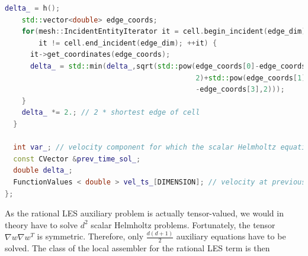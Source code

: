 \documentclass[a4paper, 11pt, twoside]{article}
\begin{document}
\begin{lstlisting}[language=C++, basicstyle={\footnotesize, \ttfamily}, keywordstyle=\color{blue},  numbers=none, tabsize=2]
    delta_ = h();
    std::vector<double> edge_coords;
    for(mesh::IncidentEntityIterator it = cell.begin_incident(edge_dim);
        it != cell.end_incident(edge_dim); ++it) {
      it->get_coordinates(edge_coords);
      delta_ = std::min(delta_,sqrt(std::pow(edge_coords[0]-edge_coords[2],
                                             2)+std::pow(edge_coords[1]
                                             -edge_coords[3],2)));
    }
    delta_ *= 2.; // 2 * shortest edge of cell
  }

  int var_; // velocity component for which the scalar Helmholtz equation is solved
  const CVector &prev_time_sol_;
  double delta_;
  FunctionValues < double > vel_ts_[DIMENSION]; // velocity at previous timestep
};
\end{lstlisting}

As the rational LES auxiliary problem is actually tensor-valued, we would in theory have to solve $d^2$ scalar Helmholtz problems. Fortunately, the tensor $\nabla w \nabla w^T$ is symmetric. Therefore, only $\frac{d(d+1)}{2}$ auxiliary equations have to be solved. The class of the local assembler for the rational LES term is then
\end{document}
